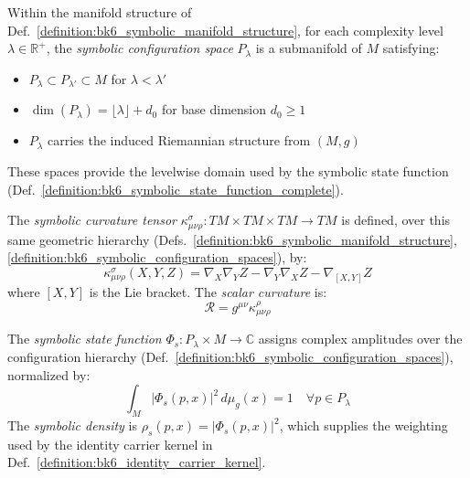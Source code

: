 \begin{definition}
\label{definition:bk6_symbolic_configuration_spaces}
Within the manifold structure of Def.~\ref{definition:bk6_symbolic_manifold_structure}, for each complexity level $\lambda \in \mathbb{R}^+$, the \emph{symbolic configuration space} $P_\lambda$ is a submanifold of $M$ satisfying:
\begin{itemize}
\item $P_\lambda \subset P_{\lambda'} \subset M$ for $\lambda < \lambda'$
\item $\dim(P_\lambda) = \lfloor \lambda \rfloor + d_0$ for base dimension $d_0 \geq 1$
\item $P_\lambda$ carries the induced Riemannian structure from $(M,g)$
\end{itemize}
These spaces provide the levelwise domain used by the symbolic state function (Def.~\ref{definition:bk6_symbolic_state_function_complete}).
\end{definition}

\begin{definition}
\label{definition:bk6_symbolic_curvature_tensor_coordinate_index}
The \emph{symbolic curvature tensor} $\kappa_{\mu\nu\rho}^\sigma : TM \times TM \times TM \to TM$ is defined, over this same geometric hierarchy (Defs.~\ref{definition:bk6_symbolic_manifold_structure}, \ref{definition:bk6_symbolic_configuration_spaces}), by:
\begin{equation}
\kappa_{\mu\nu\rho}^\sigma(X,Y,Z) = \nabla_X \nabla_Y Z - \nabla_Y \nabla_X Z - \nabla_{[X,Y]} Z
\end{equation}
where $[X,Y]$ is the Lie bracket. The \emph{scalar curvature} is:
\begin{equation}
\mathcal{R} = g^{\mu\nu} \kappa_{\mu\nu\rho}^\rho
\end{equation}
\end{definition}

\begin{definition}
\label{definition:bk6_symbolic_state_function_complete}
The \emph{symbolic state function} $\Phi_s : P_\lambda \times M \to \mathbb{C}$ assigns complex amplitudes over the configuration hierarchy (Def.~\ref{definition:bk6_symbolic_configuration_spaces}), normalized by:
\begin{equation}
\int_M |\Phi_s(p,x)|^2 \, d\mu_g(x) = 1 \quad \forall p \in P_\lambda
\end{equation}
The \emph{symbolic density} is $\rho_s(p,x) = |\Phi_s(p,x)|^2$, which supplies the weighting used by the identity carrier kernel in Def.~\ref{definition:bk6_identity_carrier_kernel}.
\end{definition}

